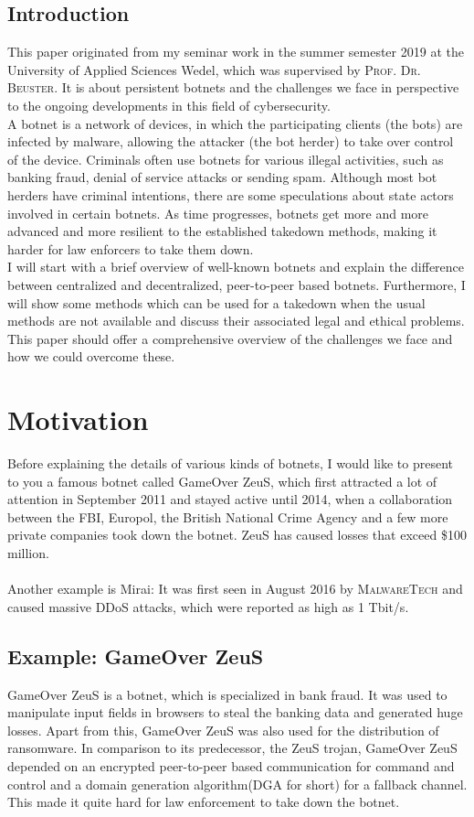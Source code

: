 \documentclass[10pt, a4paper, twocolumn]{article} %
\begin{document}
\subsection*{Introduction}
This paper originated from my seminar work in the summer semester 2019 at the University of Applied Sciences Wedel, which was supervised by \textsc{Prof. Dr. Beuster}. It is about persistent botnets and the challenges we face in perspective to the ongoing developments in this field of cybersecurity. \\
A botnet is a network of devices, in which the participating clients (the bots) are infected by malware, allowing the attacker (the bot herder) to take over control of the device. Criminals often use botnets for various illegal activities, such as banking fraud, denial of service attacks or sending spam. Although most bot herders have criminal intentions, there are some speculations about state actors involved in certain botnets. As time progresses, botnets get more and more advanced and more resilient to the established takedown methods, making it harder for law enforcers to take them down. \\
I will start with a brief overview of well-known botnets and explain the difference between centralized and decentralized, peer-to-peer based botnets. Furthermore, I will show some methods which can be used for a takedown when the usual methods are not available and discuss their associated legal and ethical problems. This paper should offer a comprehensive overview of the challenges we face and how we could overcome these.

\tableofcontents
\pagebreak
\section{Motivation}

Before explaining the details of various kinds of botnets, I would like to present to you a famous botnet called GameOver ZeuS, which first attracted a lot of attention in September 2011 and stayed active until 2014, when a collaboration between the FBI, Europol, the British National Crime Agency and a few more private companies took down the botnet\cite{briankrebs}. ZeuS has caused losses that exceed \$100 million\cite{complaint}. \\
\\
Another example is Mirai: It was first seen in August 2016 by \textsc{MalwareTech} and caused massive DDoS attacks, which were reported as high as 1 Tbit/s\cite{goodin_2016}. 
\subsection{Example: GameOver ZeuS}
   GameOver ZeuS is a botnet, which is specialized in bank fraud. It was used to manipulate input fields in browsers to steal the banking data and generated huge losses. Apart from this, GameOver ZeuS was also used for the distribution of ransomware. In comparison to its predecessor, the ZeuS trojan, GameOver ZeuS depended on an encrypted peer-to-peer based communication for command and control and a domain generation algorithm(DGA for short) for a fallback channel. This made it quite hard for law enforcement to take down the botnet.
    
\end{document}
